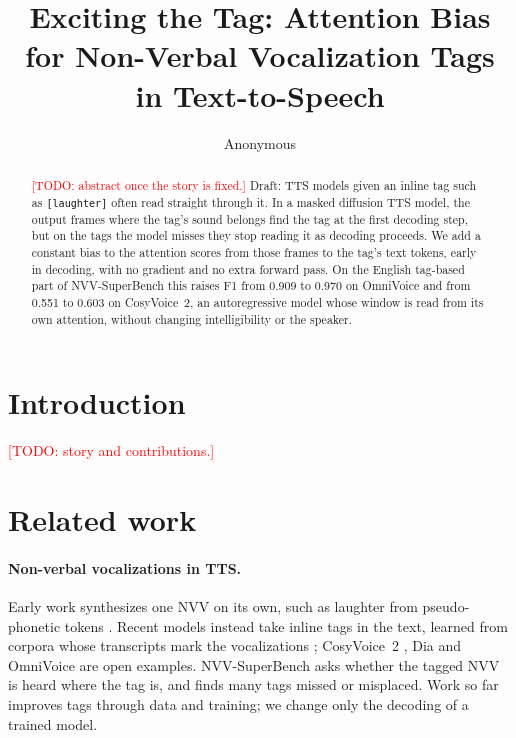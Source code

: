 \documentclass[11pt]{article}
\title{Exciting the Tag: Attention Bias for Non-Verbal Vocalization Tags in Text-to-Speech}
\author{Anonymous}
\newcommand{\tg}[1]{\texttt{[#1]}}
\newcommand{\todo}[1]{\textcolor{red}{[TODO: #1]}}
\begin{document}
\maketitle

\begin{abstract}
\todo{abstract once the story is fixed.} Draft: TTS models given an inline tag such as \tg{laughter} often read straight through it. In a masked diffusion TTS model, the output frames where the tag's sound belongs find the tag at the first decoding step, but on the tags the model misses they stop reading it as decoding proceeds. We add a constant bias to the attention scores from those frames to the tag's text tokens, early in decoding, with no gradient and no extra forward pass. On the English tag-based part of NVV-SuperBench this raises F1 from 0.909 to 0.970 on OmniVoice and from 0.551 to 0.603 on CosyVoice~2, an autoregressive model whose window is read from its own attention, without changing intelligibility or the speaker.
\end{abstract}

\section{Introduction}
\todo{story and contributions.}

\section{Related work}
\label{sec:related}

\paragraph{Non-verbal vocalizations in TTS.} Early work synthesizes one NVV on its own, such as laughter from pseudo-phonetic tokens \citep{xin2023laughter}. Recent models instead take inline tags in the text, learned from corpora whose transcripts mark the vocalizations \citep{borisov2025nonverbaltts,liao2025nvspeech}; CosyVoice~2 \citep{du2024cosyvoice2}, Dia \citep{nari2025dia} and OmniVoice \citep{zhu2026omnivoice} are open examples. NVV-SuperBench \citep{xue2026nvvsuperbench} asks whether the tagged NVV is heard where the tag is, and finds many tags missed or misplaced. Work so far improves tags through data and training; we change only the decoding of a trained model.
\end{document}
